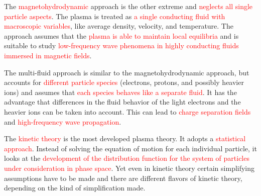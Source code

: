 \documentclass[12pt,a4paper]{article}
\begin{document}
The \textcolor{red}{magnetohydrodynamic} approach is the other extreme and \textcolor{red}{neglects all single particle aspects}. The plasma is treated as \textcolor{red}{a single conducting fluid with macroscopic variables}, like average density, velocity, and temperature. The approach assumes that the \textcolor{red}{plasma is able to maintain local equilibria} and is suitable to study \textcolor{red}{low-frequency wave phenomena in highly conducting fluids immersed in magnetic fields}.

The multi-fluid approach is similar to the magnetohydrodynamic approach, but accounts for \textcolor{red}{different particle species} (electrons, protons, and possibly heavier ions) and assumes that \textcolor{red}{each species behaves like a separate fluid}. It has the advantage that differences in the fluid behavior of the light electrons and the heavier ions can be taken into account. This can lead to \textcolor{red}{charge separation fields} and \textcolor{red}{high-frequency wave propagation}.

The \textcolor{red}{kinetic theory} is the most developed plasma theory. It adopts a \textcolor{red}{statistical approach}. Instead of solving the equation of motion for each individual particle, it looks at the \textcolor{red}{development of the distribution function for the system of particles under consideration in phase space}. Yet even in kinetic theory certain simplifying assumptions have to be made and there are different flavors of kinetic theory, depending on the kind of simplification made.
\end{document}
